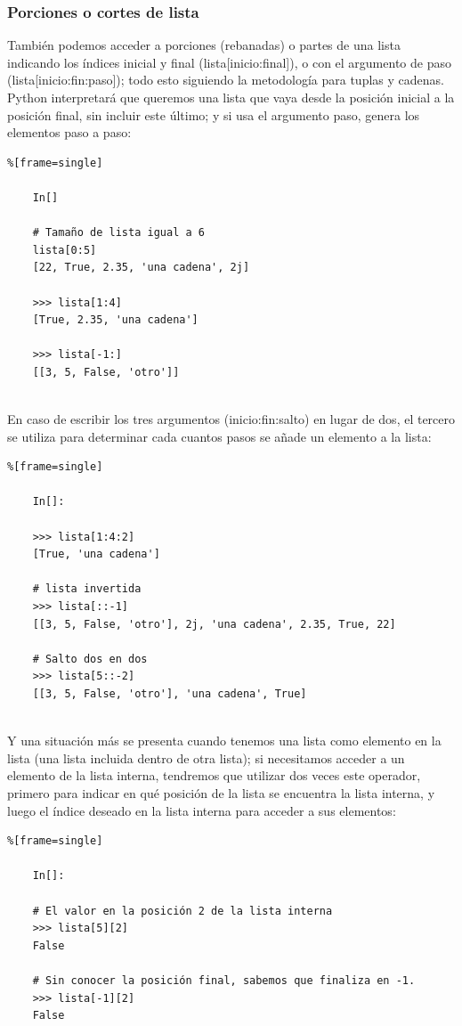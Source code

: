 \subsubsection{Porciones o cortes de lista}\label{rebanada}

También podemos acceder a porciones (rebanadas) o partes  de una lista indicando los índices inicial y  final ({\ttfamily lista[inicio:final]}), o con el argumento de paso ({\ttfamily lista[inicio:fin:paso]}); todo esto siguiendo  la metodología para tuplas y cadenas. Python interpretará que queremos una lista que vaya desde la posición inicial a la posición final, sin incluir este último; y si usa el argumento paso, genera los elementos paso a paso:

\begin{lstlisting}%[frame=single]
	
	In[]
	
	# Tamaño de lista igual a 6
	lista[0:5]
	[22, True, 2.35, 'una cadena', 2j]
	
	>>> lista[1:4]
	[True, 2.35, 'una cadena'] 
	
	>>> lista[-1:]
	[[3, 5, False, 'otro']]
	
\end{lstlisting}

\noindent En caso de escribir los tres argumentos (inicio:fin:salto) en lugar de dos, el tercero se utiliza para determinar cada cuantos pasos se añade un elemento a la lista:

\begin{lstlisting}%[frame=single]
	
	In[]:
	
	>>> lista[1:4:2]
	[True, 'una cadena'] 
	
	# lista invertida
	>>> lista[::-1]
	[[3, 5, False, 'otro'], 2j, 'una cadena', 2.35, True, 22]
	
	# Salto dos en dos
	>>> lista[5::-2]
	[[3, 5, False, 'otro'], 'una cadena', True]
	
\end{lstlisting}

Y una situación más se presenta cuando tenemos una lista como elemento en la lista (una lista incluida dentro de otra lista); si necesitamos  acceder a un elemento de la lista interna, tendremos que utilizar dos veces este operador, primero para indicar en qué posición de la lista se encuentra la lista interna, y luego el índice deseado en la lista interna para acceder a sus elementos: 

\begin{lstlisting}%[frame=single]
	
	In[]:
	
	# El valor en la posición 2 de la lista interna
	>>> lista[5][2]
	False
	
	# Sin conocer la posición final, sabemos que finaliza en -1.
	>>> lista[-1][2]
	False
\end{lstlisting}




